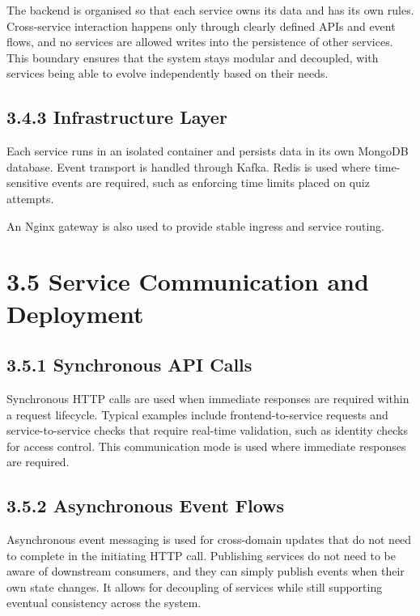 \documentclass[
  12pt,
  a4paper,
]{report}
\begin{document}
The backend is organised so that each service owns its data and has its
own rules. Cross-service interaction happens only through clearly
defined APIs and event flows, and no services are allowed writes into
the persistence of other services. This boundary ensures that the system
stays modular and decoupled, with services being able to evolve independently
based on their needs.

\hypertarget{infrastructure-layer}{%
\subsection{3.4.3 Infrastructure Layer}\label{infrastructure-layer}}

Each service runs in an isolated container and persists data in its own
MongoDB database. Event transport is handled through Kafka. Redis is
used where time-sensitive events are required, such as enforcing time
limits placed on quiz attempts.

An Nginx gateway is also used to provide stable ingress and service
routing.

\hypertarget{service-communication-and-deployment}{%
\section{3.5 Service Communication and
Deployment}\label{service-communication-and-deployment}}

\hypertarget{synchronous-api-calls}{%
\subsection{3.5.1 Synchronous API Calls}\label{synchronous-api-calls}}

Synchronous HTTP calls are used when immediate responses are required
within a request lifecycle. Typical examples include frontend-to-service
requests and service-to-service checks that require real-time
validation, such as identity checks for access control. This
communication mode is used where immediate responses are required.

\hypertarget{asynchronous-event-flows}{%
\subsection{3.5.2 Asynchronous Event
Flows}\label{asynchronous-event-flows}}

Asynchronous event messaging is used for cross-domain updates that do
not need to complete in the initiating HTTP call. Publishing services do
not need to be aware of downstream consumers, and they can simply publish
events when their own state changes. It allows for decoupling of services
while still supporting eventual consistency across the system.
\end{document}
